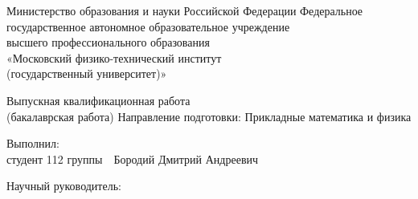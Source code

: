 \thispagestyle{empty}

\begin{center}
{\fontsize{14}{14}\selectfont
Министерство образования и науки Российской Федерации
}
{\fontsize{12}{12}\selectfont \wl}
{\fontsize{14}{14}\selectfont
Федеральное государственное автономное образовательное учреждение \\
высшего профессионального образования\\
«Московский физико-технический институт\\
(государственный университет)»
}		
{\fontsize{12}{12}\selectfont \wl}
{\fontsize{14}{14}\selectfont \departmentName }
{\fontsize{12}{12}\selectfont \wl}
{\fontsize{14}{14}\selectfont \chairName }
{\fontsize{12}{12}\selectfont \wl\wl\wl\wl}

{\fontsize{16}{19.2}\selectfont
	{\bf \thesisTitle }
}
{\fontsize{12}{12}\selectfont \wl}
{\fontsize{14}{14}\selectfont
Выпускная квалификационная работа\\
(бакалаврская работа)
}
{\fontsize{12}{12}\selectfont \wl}
{\fontsize{14}{16.8}\selectfont
Направление подготовки:  Прикладные математика и физика
}
{\fontsize{12}{12}\selectfont \wl\wl\wl}
\end{center}

{\fontsize{14}{14}\selectfont
\noindent Выполнил:\\ студент 112 группы\ \hrulefill\  Бородий Дмитрий Андреевич
}

{\fontsize{12}{12}\selectfont \wl}

{\fontsize{14}{14}\selectfont
\noindent Научный руководитель:\\
\supervisorRegalia\ \hrulefill \ \supervisorFio
}
{\fontsize{12}{12}\selectfont \wl\wl\wl\wl\wl\wl\wl\wl\wl}
\begin{center}
{\thesisCity\ \thesisYear}
\end{center}

\newpage
